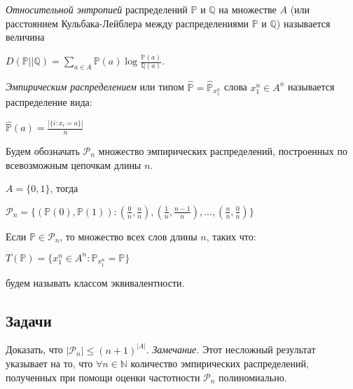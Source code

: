 \begin{definition}
\textit{Относительной энтропией} распределений $\mathbb{P}$ и $\mathbb{Q}$ на множестве $A$ (или расстоянием Кульбака-Лейблера между распределениями $\mathbb{P}$ и $\mathbb{Q}$) называется величина
\begin{center}
$D(\mathbb{P}||\mathbb{Q}) = \sum_{a \in A} \mathbb{P}(a) \log \frac{\mathbb{P}(a)}{\mathbb{Q}(a)}$.
\end{center}

\end{definition}


\begin{definition} 
\textit{Эмпирическим распределением} или типом $\hat{\mathbb{P}} = \hat{\mathbb{P}}_{x_1^n}$ слова $x_1^n\in A^n$ называется распределение вида:
\begin{center}
$\hat{\mathbb{P}}(a) = \frac{|\{i : x_i = a\}| }{n}$
\end{center}  
\end{definition}

\begin{definition} 
Будем обозначать $\mathcal{P}_n$ множество эмпирических распределений, построенных по всевозможным цепочкам длины $n$.
\end{definition}

\begin{example}
$A = \{0, 1\}$, тогда
\begin{center}
$\mathcal{P}_n = \{(\mathbb{P}(0), \mathbb{P}(1)) : (\frac{0}{n} , \frac{n}{n}), (\frac{1}{n}, \frac{n-1}{n}), ..., (\frac{n}{n}, \frac{0}{n})\}$
\end{center}
\end{example}

\begin{definition} 
Если $\mathbb{P} \in \mathcal{P}_n$, то множество всех слов длины $n$, таких что:
\begin{center}
$T(\mathbb{P}) = \{x_1^n \in A^n: \mathbb{P}_{x_1^n} = \mathbb{P}\}$
\end{center}
будем называть классом эквивалентности.
\end{definition}

\subsection{Задачи}


\begin{problem}
Доказать, что $|\mathcal{P}_n| \leq (n+1)^{|A|}$.
\textit{Замечание.} Этот несложный результат указывает на то, что $\forall n \in \mathbb{N}$ количество эмпирических распределений, полученных при помощи оценки частотности $\mathcal{P}_n$ полиномиально. 
\end{problem}

